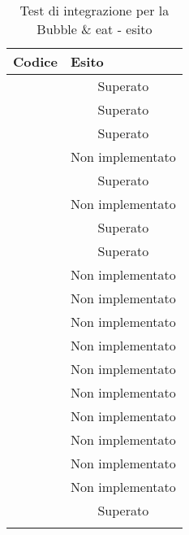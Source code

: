 \begin{longtable}{|c|c|}
	\hline \multicolumn{1}{|l|}{\textbf{Codice}} & \multicolumn{1}{l|}{\textbf{Esito}}
	\\
	\hline \testt{} & Superato\\
	\hline \testt{} & Superato\\
	\hline \testt{} & Superato\\
	\hline \testt{} & Non implementato\\
	\hline \testt{} & Superato\\
	\hline \testt{} & Non implementato\\
	\hline \testt{} & Superato\\
	\hline \testt{} & Superato\\
	\hline \testt{} & Non implementato\\
	\hline \testt{} & Non implementato\\
	\hline \testt{} & Non implementato\\
	\hline \testt{} & Non implementato\\
	\hline \testt{} & Non implementato\\
	\hline \testt{} & Non implementato\\
	\hline \testt{} & Non implementato\\
	\hline \testt{} & Non implementato\\
	\hline \testt{} & Non implementato\\
	\hline \testt{} & Non implementato\\
	\hline \testt{} & Superato\\
	\hline
	\caption{Test di integrazione per la Bubble \& eat - esito}
\end{longtable}

